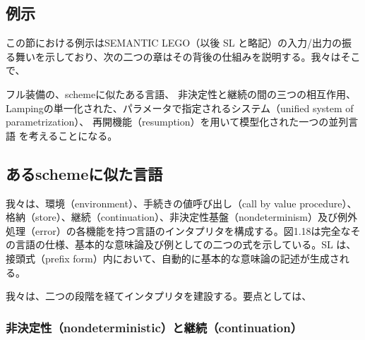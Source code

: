 \documentclass[11pt, oneside]{jsarticle}   	%
\begin{document}





\subsection{例示}
この節における例示はSEMANTIC LEGO（以後 SL と略記）の入力/出力の振る舞いを示しており、次の二つの章はその背後の仕組みを説明する。我々はそこで、

フル装備の、schemeに似たある言語、
非決定性と継続の間の三つの相互作用、
Lampingの単一化された、パラメータで指定されるシステム（unified system of parametrization）、
再開機能（resumption）を用いて模型化された一つの並列言語
を考えることになる。







\subsection{あるschemeに似た言語}
我々は、環境（environment）、手続きの値呼び出し（call by value procedure）、格納（store）、継続（continuation）、非決定性基盤（nondeterminism）及び例外処理（error）の各機能を持つ言語のインタプリタを構成する。図1.18は完全なその言語の仕様、基本的な意味論及び例としての二つの式を示している。SL は、接頭式（prefix form）内において、自動的に基本的な意味論の記述が生成される。

我々は、二つの段階を経てインタプリタを建設する。要点としては、

\subsubsection{非決定性（nondeterministic）と継続（continuation）}




\end{document}
